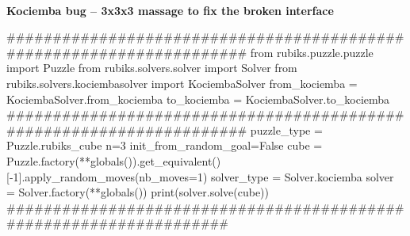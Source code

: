 \afblue
\paragraph{}{\textbf{Kociemba bug -- 3x3x3 massage to fix the broken interface}}
\begin{python}
#####################################################################
from rubiks.puzzle.puzzle import Puzzle
from rubiks.solvers.solver import Solver
from rubiks.solvers.kociembasolver import KociembaSolver
from_kociemba = KociembaSolver.from_kociemba
to_kociemba = KociembaSolver.to_kociemba
#####################################################################
puzzle_type = Puzzle.rubiks_cube
n=3
init_from_random_goal=False
cube = Puzzle.factory(**globals()).get_equivalent()[-1].apply_random_moves(nb_moves=1)
solver_type = Solver.kociemba
solver = Solver.factory(**globals())
print(solver.solve(cube))
###################################################################
\end{python}
\black


